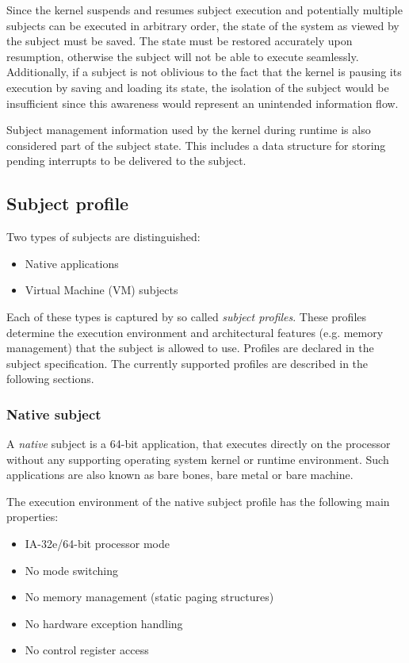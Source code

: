 Since the kernel suspends and resumes subject execution and potentially
multiple subjects can be executed in arbitrary order, the state of the system
as viewed by the subject must be saved. The state must be restored accurately
upon resumption, otherwise the subject will not be able to execute seamlessly.
Additionally, if a subject is not oblivious to the fact that the kernel is
pausing its execution by saving and loading its state, the isolation of the
subject would be insufficient since this awareness would represent an unintended
information flow.

Subject management information used by the kernel during runtime is also
considered part of the subject state. This includes a data structure for
storing pending interrupts to be delivered to the subject.

\subsection{Subject profile}
Two types of subjects are distinguished:

\begin{itemize}
	\item Native applications
	\item Virtual Machine (VM) subjects
\end{itemize}

Each of these types is captured by so called \emph{subject
profiles}. These profiles determine the execution
environment and architectural features (e.g.  memory management) that the
subject is allowed to use. Profiles are declared in the subject specification.
The currently supported profiles are described in the following sections.

\subsubsection{Native subject}
A \emph{native} subject is a 64-bit application, that executes directly on the
processor without any supporting operating system kernel or runtime environment.
Such applications are also known as bare bones, bare metal or bare machine.

The execution environment of the native subject profile has the following main
properties:

\begin{itemize}
	\item IA-32e/64-bit processor mode
	\item No mode switching
	\item No memory management (static paging structures)
	\item No hardware exception handling
	\item No control register access
\end{itemize}

